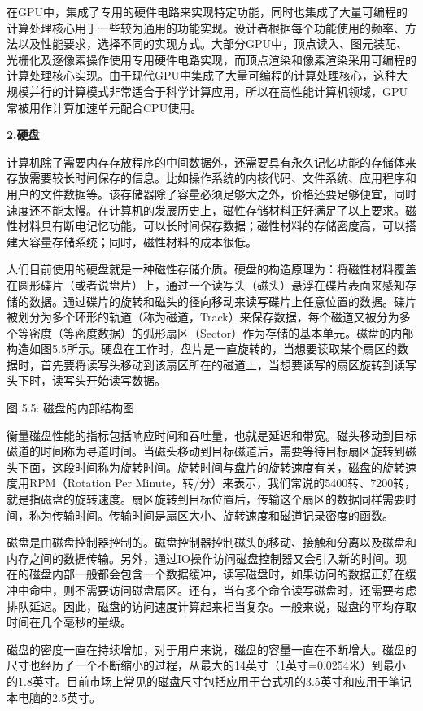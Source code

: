 \documentclass[]{ctexbook}
\begin{document}
在GPU中，集成了专用的硬件电路来实现特定功能，同时也集成了大量可编程的计算处理核心用于一些较为通用的功能实现。设计者根据每个功能使用的频率、方法以及性能要求，选择不同的实现方式。大部分GPU中，顶点读入、图元装配、光栅化及逐像素操作使用专用硬件电路实现，而顶点渲染和像素渲染采用可编程的计算处理核心实现。由于现代GPU中集成了大量可编程的计算处理核心，这种大规模并行的计算模式非常适合于科学计算应用，所以在高性能计算机领域，GPU常被用作计算加速单元配合CPU使用。

\textbf{2.硬盘}

计算机除了需要内存存放程序的中间数据外，还需要具有永久记忆功能的存储体来存放需要较长时间保存的信息。比如操作系统的内核代码、文件系统、应用程序和用户的文件数据等。该存储器除了容量必须足够大之外，价格还要足够便宜，同时速度还不能太慢。在计算机的发展历史上，磁性存储材料正好满足了以上要求。磁性材料具有断电记忆功能，可以长时间保存数据；磁性材料的存储密度高，可以搭建大容量存储系统；同时，磁性材料的成本很低。

人们目前使用的硬盘就是一种磁性存储介质。硬盘的构造原理为：将磁性材料覆盖在圆形碟片（或者说盘片）上，通过一个读写头（磁头）悬浮在碟片表面来感知存储的数据。通过碟片的旋转和磁头的径向移动来读写碟片上任意位置的数据。碟片被划分为多个环形的轨道（称为磁道，Track）来保存数据，每个磁道又被分为多个等密度（等密度数据）的弧形扇区（Sector）作为存储的基本单元。磁盘的内部构造如图5.5所示。硬盘在工作时，盘片是一直旋转的，当想要读取某个扇区的数据时，首先要将读写头移动到该扇区所在的磁道上，当想要读写的扇区旋转到读写头下时，读写头开始读写数据。

图 5.5: 磁盘的内部结构图

衡量磁盘性能的指标包括响应时间和吞吐量，也就是延迟和带宽。磁头移动到目标磁道的时间称为寻道时间。当磁头移动到目标磁道后，需要等待目标扇区旋转到磁头下面，这段时间称为旋转时间。旋转时间与盘片的旋转速度有关，磁盘的旋转速度用RPM（Rotation Per Minute，转/分）来表示，我们常说的5400转、7200转，就是指磁盘的旋转速度。扇区旋转到目标位置后，传输这个扇区的数据同样需要时间，称为传输时间。传输时间是扇区大小、旋转速度和磁道记录密度的函数。

磁盘是由磁盘控制器控制的。磁盘控制器控制磁头的移动、接触和分离以及磁盘和内存之间的数据传输。另外，通过IO操作访问磁盘控制器又会引入新的时间。现在的磁盘内部一般都会包含一个数据缓冲，读写磁盘时，如果访问的数据正好在缓冲中命中，则不需要访问磁盘扇区。还有，当有多个命令读写磁盘时，还需要考虑排队延迟。因此，磁盘的访问速度计算起来相当复杂。一般来说，磁盘的平均存取时间在几个毫秒的量级。

磁盘的密度一直在持续增加，对于用户来说，磁盘的容量一直在不断增大。磁盘的尺寸也经历了一个不断缩小的过程，从最大的14英寸（1英寸=0.0254米）到最小的1.8英寸。目前市场上常见的磁盘尺寸包括应用于台式机的3.5英寸和应用于笔记本电脑的2.5英寸。
\end{document}
